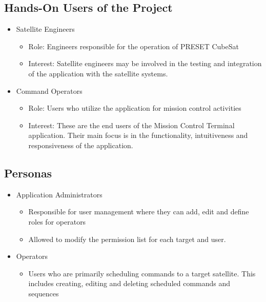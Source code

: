 \documentclass[12pt]{article}
\begin{document}
\subsection{Hands-On Users of the Project}
\begin{itemize}
    \item Satellite Engineers
    \begin{itemize}
        \item Role: Engineers responsible for the operation of PRESET CubeSat

        \item Interest: Satellite engineers may be involved in the testing and integration of the application with the satellite systems.

    \end{itemize}
    \item Command Operators
    \begin{itemize}
        \item Role: Users who utilize the application for mission control activities
        \item Interest: These are the end users of the Mission Control Terminal application. Their main focus is in the functionality, intuitiveness and responsiveness of the application.

    \end{itemize}
\end{itemize}

\subsection{Personas}
\begin{itemize}
    \item Application Administrators
    \begin{itemize}
        \item Responsible for user management where they can add, edit and define roles for operators
        \item Allowed to modify the permission list for each target and user.
    \end{itemize}

    \item Operators
    \begin{itemize}
        \item Users who are primarily scheduling commands to a target satellite. This includes creating, editing and deleting scheduled commands and sequences
    \end{itemize}
\end{itemize}
\end{document}
